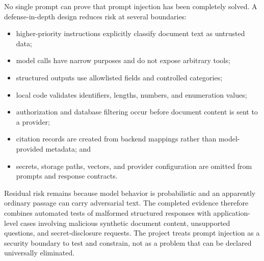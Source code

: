 No single prompt can prove that prompt injection has been completely solved. A defense-in-depth design reduces risk at several boundaries:

\begin{itemize}
    \item higher-priority instructions explicitly classify document text as untrusted data;
    \item model calls have narrow purposes and do not expose arbitrary tools;
    \item structured outputs use allowlisted fields and controlled categories;
    \item local code validates identifiers, lengths, numbers, and enumeration values;
    \item authorization and database filtering occur before document content is sent to a provider;
    \item citation records are created from backend mappings rather than model-provided metadata; and
    \item secrets, storage paths, vectors, and provider configuration are omitted from prompts and response contracts.
\end{itemize}

Residual risk remains because model behavior is probabilistic and an apparently ordinary passage can carry adversarial text. The completed evidence therefore combines automated tests of malformed structured responses with application-level cases involving malicious synthetic document content, unsupported questions, and secret-disclosure requests. The project treats prompt injection as a security boundary to test and constrain, not as a problem that can be declared universally eliminated.
